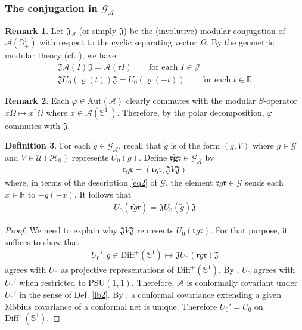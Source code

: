 \documentclass[11pt,b5paper,notitlepage]{article}
\theoremstyle{definition}
\newtheorem{df}{Definition}[section]
\newtheorem{rem}[df]{Remark}
\theoremstyle{plain}
\newcommand{\fk}{\mathfrak}
\newcommand{\wtd}{\widetilde}
\newcommand{\DiffS}{\mathrm{Diff}^+(\mathbb S^1)}
\newcommand{\PSU}{\mathrm{PSU}(1,1)}
\newcommand{\GA}{\mathscr G_{\mathcal A}}
\newcommand{\Rbb}{\mathbb R}
\newcommand{\Sbb}{{\mathbb S}}
\newcommand{\rk}{\mathfrak r}
\newcommand{\Aut}{\mathrm{Aut}}
\newcommand{\MA}{\mathcal A}
\newcommand{\MH}{\mathcal H}
\newcommand{\MJ}{\mathcal J}
\newcommand{\MU}{\mathcal U}
\newcommand{\SG}{\mathscr G}
\numberwithin{equation}{section}
\begin{document}
\subsubsection{The conjugation in $\GA$}\label{lb142}


\begin{rem}\label{lb37}
Let $\pmb{\fk J_\MA}$ (or simply $\fk J$) be the (involutive) modular conjugation of $\MA(\Sbb^1_+)$ with respect to the cyclic separating vector $\Omega$. By the geometric modular theory (cf. \cite[Sec. II.2]{GF93}), we have
\begin{gather*}
\fk J\MA(I)\fk J=\MA(\rk I)\qquad\text{for each }I\in\MJ\\
\fk JU_0(\varrho(t))\fk J=U_0(\varrho(-t))\qquad\text{for each }t\in\Rbb
\end{gather*}
\end{rem}


\begin{rem}\label{lb38}
Each $\varphi\in\Aut(\MA)$ clearly commutes with the modular $S$-operator $x\Omega\mapsto x^*\Omega$ where $x\in\MA(\Sbb^1_+)$. Therefore, by the polar decomposition, $\varphi$ commutes with $\fk J$.
\end{rem}


\begin{df}\label{lb51}
For each $\wtd g\in\GA$, recall that $\wtd g$ is of the form $(g,V)$ where $g\in\SG$ and $V\in\MU(\MH_0)$ represents $U_0(g)$. Define $\pmb{\rk\wtd g\rk}\in\GA$ by
\begin{align}
\rk\wtd g\rk=(\rk g\rk,\fk JV\fk J)
\end{align} 
where, in terms of the description \eqref{eq2} of $\SG$, the element $\rk g\rk\in\SG$ sends each $x\in\Rbb$ to $-g(-x)$. It follows that
\begin{align}\label{eq20}
U_0(\rk\wtd g\rk)=\fk JU_0(\wtd g)\fk J
\end{align}
\end{df}

\begin{proof}
We need to explain why $\fk JV\fk J$ represents $U_0(\rk g\rk)$. For that purpose, it suffices to show that
\begin{align*}
U_0':g\in\DiffS\mapsto \fk JU_0(\rk g\rk)\fk J
\end{align*}
agrees with $U_0$ as projective representations of $\DiffS$. By \cite[Thm. 2.19]{GF93}, $U_0$ agrees with $U_0'$ when restricted to $\PSU$. Therefore, $\MA$ is conformally covariant under $U_0'$ in the sense of Def. \ref{lb2}. By \cite[Thm. 6.1.9]{Wei05}, a conformal covariance extending a given M\"obius covariance of a conformal net is unique. Therefore $U_0'=U_0$ on $\DiffS$.
\end{proof}
\end{document}
